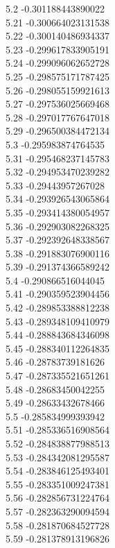 {5.2	-0.301188443890022\\
5.21	-0.300664023131538\\
5.22	-0.300140486934337\\
5.23	-0.299617833905191\\
5.24	-0.299096062652728\\
5.25	-0.298575171787425\\
5.26	-0.298055159921613\\
5.27	-0.297536025669468\\
5.28	-0.297017767647018\\
5.29	-0.296500384472134\\
5.3	-0.295983874764535\\
5.31	-0.295468237145783\\
5.32	-0.294953470239282\\
5.33	-0.29443957267028\\
5.34	-0.293926543065864\\
5.35	-0.293414380054957\\
5.36	-0.292903082268325\\
5.37	-0.292392648338567\\
5.38	-0.291883076900116\\
5.39	-0.291374366589242\\
5.4	-0.290866516044045\\
5.41	-0.290359523904456\\
5.42	-0.289853388812238\\
5.43	-0.289348109410979\\
5.44	-0.288843684346098\\
5.45	-0.288340112264835\\
5.46	-0.28783739181626\\
5.47	-0.287335521651261\\
5.48	-0.28683450042255\\
5.49	-0.28633432678466\\
5.5	-0.285834999393942\\
5.51	-0.285336516908564\\
5.52	-0.284838877988513\\
5.53	-0.284342081295587\\
5.54	-0.283846125493401\\
5.55	-0.283351009247381\\
5.56	-0.282856731224764\\
5.57	-0.282363290094594\\
5.58	-0.281870684527728\\
5.59	-0.281378913196826\\
}
